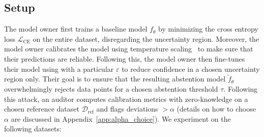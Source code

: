 
\subsection{Setup}
\label{sec:exp_setup}

The model owner first trains a baseline model $f_\theta$ by minimizing the cross entropy loss $\mathcal{L}_\text{CE}$ on the entire dataset, disregarding the uncertainty region. Moreover, the model owner calibrates the model using temperature scaling~\citep{guo2017calibration} to make sure that their predictions are reliable. Following this, the model owner then fine-tunes their model using \attack with a particular $\varepsilon$ to reduce confidence in a chosen uncertainty region only. Their goal is to ensure that the resulting abstention model $\tilde{f}_\theta$ overwhelmingly rejects data points for a chosen abstention threshold $\tau$. Following this attack, an auditor computes calibration metrics with zero-knowledge on a chosen reference dataset $\mathcal{D}_\text{ref}$ and flags deviations $> \alpha$ (details on how to choose $\alpha$ are discussed in Appendix~\ref{app:alpha_choice}). We experiment on the following datasets:

